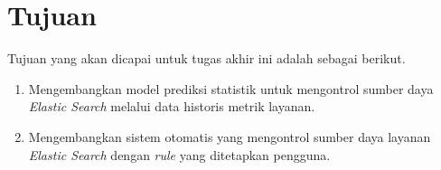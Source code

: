 \section{Tujuan}

Tujuan yang akan dicapai untuk tugas akhir ini adalah sebagai berikut.

\begin{enumerate}
    \item Mengembangkan model prediksi statistik untuk mengontrol sumber daya \textit{Elastic Search} melalui data historis metrik layanan.
    \item Mengembangkan sistem otomatis yang mengontrol sumber daya layanan \textit{Elastic Search} dengan \textit{rule} yang ditetapkan pengguna.
\end{enumerate}